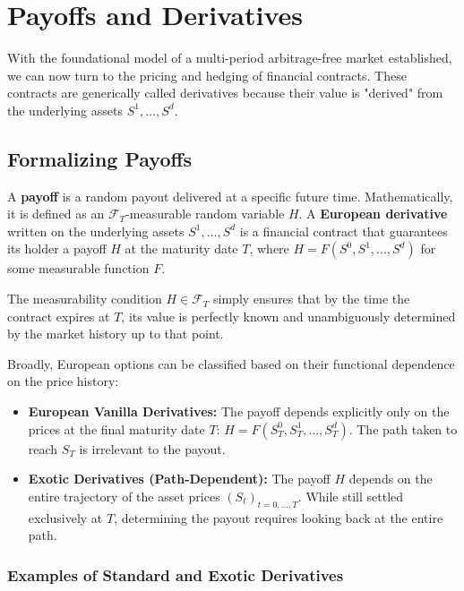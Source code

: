 \chapter{Payoffs and Derivatives}
\label{chap:payoffs_and_derivatives}

With the foundational model of a multi-period arbitrage-free market established, we can now turn to the pricing and hedging of financial contracts. These contracts are generically called derivatives because their value is "derived" from the underlying assets $S^1, \dots, S^d$.

\section{Formalizing Payoffs}

\begin{definition}
    A \textbf{payoff} is a random payout delivered at a specific future time. Mathematically, it is defined as an $\mathcal{F}_T$-measurable random variable $H$.
    A \textbf{European derivative} written on the underlying assets $S^1, \dots, S^d$ is a financial contract that guarantees its holder a payoff $H$ at the maturity date $T$, where $H = F(S^0, S^1, \dots, S^d)$ for some measurable function $F$.
\end{definition}

The measurability condition $H \in \mathcal{F}_T$ simply ensures that by the time the contract expires at $T$, its value is perfectly known and unambiguously determined by the market history up to that point.

Broadly, European options can be classified based on their functional dependence on the price history:
\begin{itemize}
    \item \textbf{European Vanilla Derivatives:} The payoff depends explicitly only on the prices at the final maturity date $T$: $H = F(S_T^0, S_T^1, \dots, S_T^d)$. The path taken to reach $S_T$ is irrelevant to the payout.
    \item \textbf{Exotic Derivatives (Path-Dependent):} The payoff $H$ depends on the entire trajectory of the asset prices $(S_t)_{t=0, \dots, T}$. While still settled exclusively at $T$, determining the payout requires looking back at the entire path.
\end{itemize}

\subsection{Examples of Standard and Exotic Derivatives}

